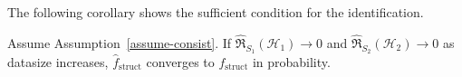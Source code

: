 The following corollary shows the sufficient condition for the identification.

\begin{corollary}
    Assume Assumption~\ref{assume-consist}. If $\hat{\mathfrak{R}}_{S_1}(\mathcal{H}_1) \to 0$ and $\hat{\mathfrak{R}}_{S_2}(\mathcal{H}_2) \to 0$ as datasize increases, $\hat{f}_{\mathrm{struct}}$ converges to ${f}_{\mathrm{struct}}$ in probability.
\end{corollary}

